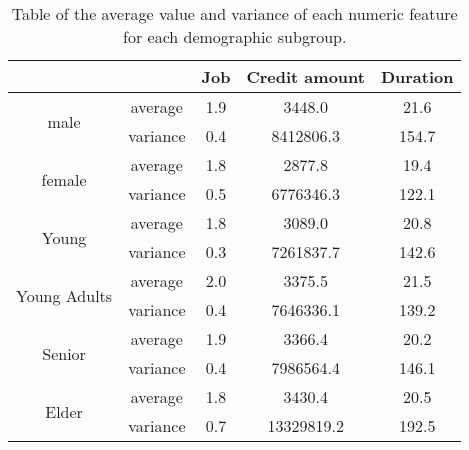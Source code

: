 \documentclass[conference]{IEEEtran}
\begin{document}
\begin{table}[ht]
\begin{center}
\caption{Table of the average value and variance of each numeric feature for each demographic subgroup.}
\begin{tabular}{ |c|c|c|c|c| } 
    \hline
    & & Job   & Credit amount & Duration\\ 
    \hline
    \multirow{2}{4em}{male} 
    & average & 1.9 & 3448.0 & 21.6 \\ 
    & variance & 0.4 & 8412806.3 & 154.7 \\ 
    \hline
    \multirow{2}{4em}{female} 
    & average & 1.8 & 2877.8 & 19.4 \\ 
    & variance & 0.5 & 6776346.3 & 122.1 \\
    \hline
    \multirow{2}{4em}{Young} 
    & average & 1.8 & 3089.0 & 20.8 \\ 
    & variance & 0.3 & 7261837.7 & 142.6 \\
    \hline
    \multirow{2}{4em}{Young Adults} 
    & average & 2.0 & 3375.5 & 21.5\\ 
    & variance & 0.4 & 7646336.1 & 139.2 \\
    \hline
    \multirow{2}{4em}{Senior} 
    & average & 1.9 & 3366.4 & 20.2 \\ 
    & variance & 0.4 & 7986564.4 & 146.1 \\
    \hline
    \multirow{2}{4em}{Elder} 
    & average & 1.8 & 3430.4 & 20.5\\ 
    & variance & 0.7 & 13329819.2 & 192.5\\
    \hline
\end{tabular}
\label{table:2}
\end{center}
\end{table}
\end{document}
